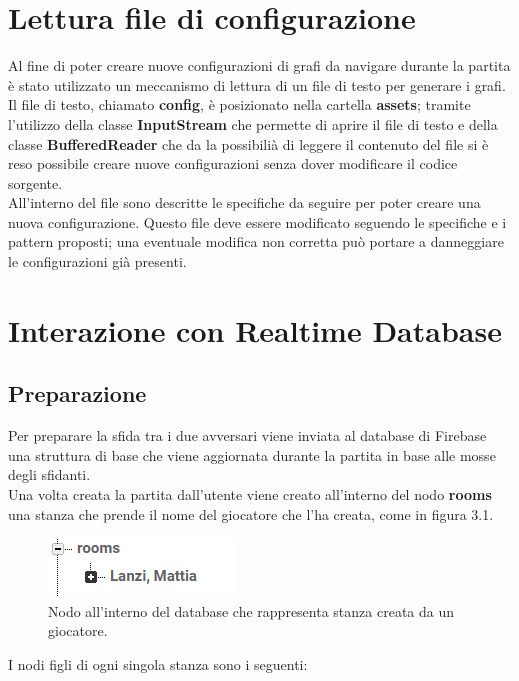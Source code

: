 \documentclass[a4paper,11pt,twoside,openright]{report}
\begin{document}
\section{Lettura file di configurazione}
Al fine di poter creare nuove configurazioni di grafi da navigare durante la partita è stato utilizzato un meccanismo di lettura di un file di testo per generare i grafi.\\
Il file di testo, chiamato \textbf{config}, è posizionato nella cartella \textbf{assets}; tramite l'utilizzo della classe \textbf{InputStream} che permette di aprire il file di testo e della classe \textbf{BufferedReader} che da la possibilià di leggere il contenuto del file si è reso possibile creare nuove configurazioni senza dover modificare il codice sorgente.\\
All'interno del file sono descritte le specifiche da seguire per poter creare una nuova configurazione. Questo file deve essere modificato seguendo le specifiche e i pattern proposti; una eventuale modifica non corretta può portare a danneggiare le configurazioni già presenti.\\

\section{Interazione con Realtime Database}
\subsection{Preparazione}
Per preparare la sfida tra i due avversari viene inviata al database di Firebase una struttura di base che viene aggiornata durante la partita in base alle mosse degli sfidanti.\\
Una volta creata la partita dall'utente viene creato all'interno del nodo \textbf{rooms} una stanza che prende il nome del giocatore che l'ha creata, come in figura 3.1.\\
\begin{figure}[h]
\includegraphics{images/Room node.png}
\caption{Nodo all'interno del database che rappresenta stanza creata da un giocatore.}
\end{figure}

I nodi figli di ogni singola stanza sono i seguenti:
\end{document}
